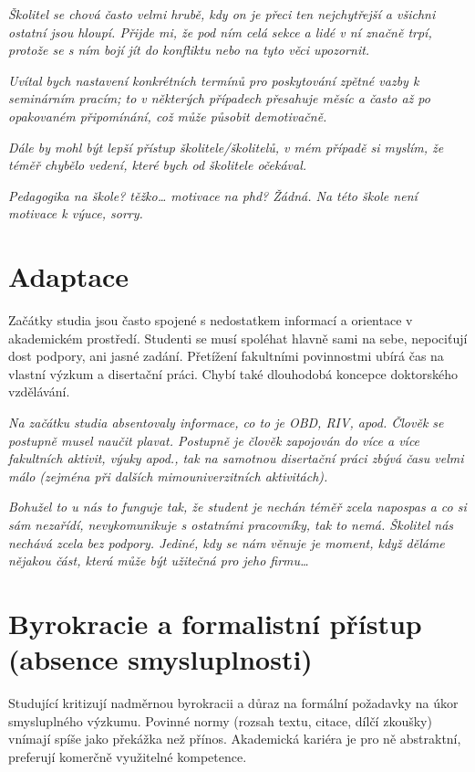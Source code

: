 \documentclass[
  czech,
  14pt,
  a4paper,
  DIV=11,
  numbers=noendperiod]{scrreprt}
\begin{document}
\emph{Školitel se chová často velmi hrubě, kdy on je přeci ten
nejchytřejší a všichni ostatní jsou hloupí. Přijde mi, že pod ním celá
sekce a lidé v ní značně trpí, protože se s ním bojí jít do konfliktu
nebo na tyto věci upozornit.}

\emph{Uvítal bych nastavení konkrétních termínů pro poskytování zpětné
vazby k seminárním pracím; to v některých případech přesahuje měsíc a
často až po opakovaném připomínání, což může působit demotivačně.}

\emph{Dále by mohl být lepší přístup školitele/školitelů, v mém případě
si myslím, že téměř chybělo vedení, které bych od školitele očekával.}

\emph{Pedagogika na škole? těžko\ldots{} motivace na phd? Žádná. Na této
škole není motivace k výuce, sorry.}

\section{Adaptace}\label{adaptace}

Začátky studia jsou často spojené s nedostatkem informací a orientace v
akademickém prostředí. Studenti se musí spoléhat hlavně sami na sebe,
nepociťují dost podpory, ani jasné zadání. Přetížení fakultními
povinnostmi ubírá čas na vlastní výzkum a disertační práci. Chybí také
dlouhodobá koncepce doktorského vzdělávání.

\emph{Na začátku studia absentovaly informace, co to je OBD, RIV, apod.
Člověk se postupně musel naučit plavat. Postupně je člověk zapojován do
více a více fakultních aktivit, výuky apod., tak na samotnou disertační
práci zbývá času velmi málo (zejména při dalších mimouniverzitních
aktivitách).}

\emph{Bohužel to u nás to funguje tak, že student je nechán téměř zcela
napospas a co si sám nezařídí, nevykomunikuje s ostatními pracovníky,
tak to nemá. Školitel nás nechává zcela bez podpory. Jediné, kdy se nám
věnuje je moment, když děláme nějakou část, která může být užitečná pro
jeho firmu\ldots{}}

\section{Byrokracie a formalistní přístup (absence
smysluplnosti)}\label{byrokracie-a-formalistnuxed-pux159uxedstup-absence-smysluplnosti}

Studující kritizují nadměrnou byrokracii a důraz na formální požadavky
na úkor smysluplného výzkumu. Povinné normy (rozsah textu, citace, dílčí
zkoušky) vnímají spíše jako překážka než přínos. Akademická kariéra je
pro ně abstraktní, preferují komerčně využitelné kompetence.
\end{document}
